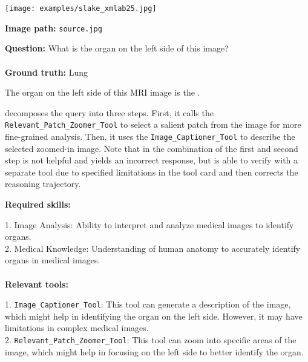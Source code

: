 
\begin{querybox}
\begin{minipage}{0.2\linewidth}
    \texttt{[image: examples/slake\_xmlab25.jpg]}
\end{minipage}
\hspace{5pt}
\begin{minipage}{0.75\linewidth}
    \textbf{Image path:} \texttt{source.jpg}

    \textbf{Question:} What is the organ on the left side of this image?
    \\\\
    \textbf{Ground truth:} Lung
    \vspace{20pt}
\end{minipage}
\end{querybox}


\begin{querybox}
The organ on the left side of this MRI image is the .
\end{querybox}

\model decomposes the query into three steps. First, it calls the \texttt{Relevant\_Patch\_Zoomer\_Tool} to select a salient patch from the image for more fine-grained analysis. Then, it uses the \texttt{Image\_Captioner\_Tool} to describe the selected zoomed-in image. Note that in the combination of the first and second step is not helpful and yields an incorrect response, but \model is able to verify with a separate tool due to specified limitations in the tool card and then corrects the reasoning trajectory.

\begin{plannerbox}
\textbf{Required skills:}

1. Image Analysis: Ability to interpret and analyze medical images to identify organs.\\
2. Medical Knowledge: Understanding of human anatomy to accurately identify organs in medical images.
\\\\
\textbf{Relevant tools:}

1. \texttt{Image\_Captioner\_Tool}: This tool can generate a description of the image, which might help in identifying the organ on the left side. However, it may have limitations in complex medical images.\\
2. \texttt{Relevant\_Patch\_Zoomer\_Tool}: This tool can zoom into specific areas of the image, which might help in focusing on the left side to better identify the organ.
\end{plannerbox}


